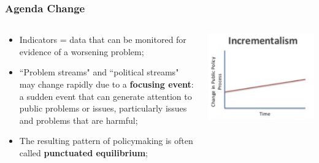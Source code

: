 \documentclass[aspectratio=169]{beamer}
\theoremstyle{principle}
\begin{document}
\begin{frame}
\frametitle{Agenda Change}
\begin{columns}

\begin{column}{0.5\textwidth}

\begin{itemize}
\item Indicators = data that can be monitored for evidence of a worsening problem;
\bigskip
\bigskip
\item ``Problem streams" and ``political streams" may change rapidly due to a \textbf{focusing event}: a sudden event that can generate attention to public problems or issues, particularly issues and problems that are harmful;
\bigskip
\bigskip
\item The resulting pattern of policymaking is often called \textbf{punctuated equilibrium};
\end{itemize}
\end{column}
\begin{column}{0.5\textwidth}
    \begin{center}
     \includegraphics[scale=0.5]{incrementalism.png}
     \end{center}
\end{column}
\end{columns}
\end{frame}
\end{document}
